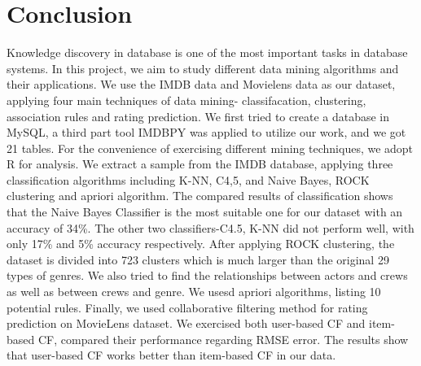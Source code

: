 \documentclass[conference]{IEEEtran}
\begin{document}
\section{Conclusion}
Knowledge discovery in database is one of the most important tasks in database systems. In this project, we aim to study different data mining algorithms and their applications. We use the IMDB data and Movielens data as our dataset, applying four main techniques of data mining- classifacation, clustering, association rules and rating prediction. We first tried to create a database in MySQL, a third part tool IMDBPY was applied to utilize our work, and we got 21 tables. For the convenience of exercising different mining techniques, we adopt R for analysis. We extract a sample from the IMDB database, applying three classification algorithms including K-NN, C4,5, and Naive Bayes, ROCK clustering and apriori algorithm. The compared results of classification shows that the Naive Bayes Classifier is the most suitable one for our dataset with an accuracy of 34\%. The other two classifiers-C4.5, K-NN did not perform well, with only 17\% and 5\% accuracy respectively. After applying ROCK clustering, the dataset is divided into 723 clusters which is much larger than the original 29 types of genres. We also tried to find the relationships between actors and crews as well as between crews and genre. We usesd apriori algorithms, listing 10 potential rules. Finally, we used collaborative filtering method for rating prediction on MovieLens dataset. We exercised both user-based CF and item-based CF, compared their performance regarding RMSE error. The results show that user-based CF works better than item-based CF in our data.















\end{document}

